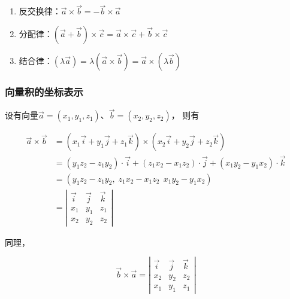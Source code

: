 \documentclass[12pt, a4paper]{article}
\numberwithin{equation}{section}
\begin{document}
    \begin{enumerate}
        \item 反交换律：\(\overrightarrow{a} \times \overrightarrow{b} = 
            - \overrightarrow{b} \times \overrightarrow{a}\)
        \item 分配律：\(\left(\overrightarrow{a} + \overrightarrow{b}\right) \times \overrightarrow{c}
            = \overrightarrow{a} \times \overrightarrow{c} + \overrightarrow{b} \times \overrightarrow{c}\)
        \item 结合律：\(\left(\lambda \overrightarrow{a}\right) = \lambda \left(\overrightarrow{a}
            \times \overrightarrow{b}\right) = \overrightarrow{a} \times \left(\lambda \overrightarrow{b}\right)\)
    \end{enumerate}

\subsubsection{向量积的坐标表示}

    设有向量\(\overrightarrow{a} = \left(x_1, y_1, z_1\right)\)、\(\overrightarrow{b} = \left(x_2, y_2, z_2\right)\)，
    则有
    
    \begin{align*}
        \overrightarrow{a} \times \overrightarrow{b} &= \left(x_1\overrightarrow{i} + y_1\overrightarrow{j}
        + z_1\overrightarrow{k}\right) \times \left(x_2\overrightarrow{i} + y_2\overrightarrow{j} +
        z_2\overrightarrow{k}\right)
        \\
        &= \left(y_1z_2 - z_1y_2\right) \cdot \overrightarrow{i} + \left(z_1x_2 - x_1z_2\right) \cdot \overrightarrow{j}
        + \left(x_1y_2 - y_1x_2\right) \cdot \overrightarrow{k}
        \\
        &= \left(y_1z_2 - z_1y_2,\; z_1x_2 - x_1z_2\,\; x_1y_2 - y_1x_2\right)
        \\
        &= \left|
            \begin{array}{cccc}
            \overrightarrow{i} & \overrightarrow{j} & \overrightarrow{k} \\
            x_1 & y_1 & z_1 \\
            x_2 & y_2 & z_2
            \end{array}
        \right|
    \end{align*}

    同理，

    \[
        \overrightarrow{b} \times \overrightarrow{a} =
        \left|
            \begin{array}{cccc}
            \overrightarrow{i} & \overrightarrow{j} & \overrightarrow{k} \\
            x_2 & y_2 & z_2 \\
            x_1 & y_1 & z_1
            \end{array}
        \right|
    \]
\end{document}
